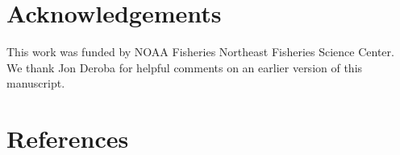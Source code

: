 \documentclass[
  12pt,
]{article}
\begin{document}
\hypertarget{acknowledgements}{%
\section*{Acknowledgements}\label{acknowledgements}}

This work was funded by NOAA Fisheries Northeast Fisheries Science
Center. We thank Jon Deroba for helpful comments on an earlier version
of this manuscript.

\pagebreak

\hypertarget{references}{%
\section*{References}\label{references}}
\end{document}
